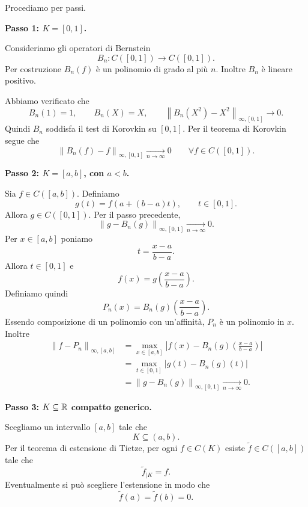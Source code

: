 \documentclass[a4paper]{article}
\begin{document}
\begin{snippetproof}{}
    Procediamo per passi.

    \medskip

    \noindent
    \textbf{Passo 1: \(K=[0,1]\).}

    Consideriamo gli operatori di Bernstein
    \[
        B_n : C([0,1])\longrightarrow C([0,1]).
    \]
    Per costruzione \(B_n(f)\) è un polinomio di grado al più \(n\). Inoltre \(B_n\) è lineare positivo.

    Abbiamo verificato che
    \[
        B_n(1)=1,
        \qquad
        B_n(X)=X,
        \qquad
        \left\|B_n(X^2)-X^2\right\|_{\infty,[0,1]}\to 0.
    \]
    Quindi \(B_n\) soddisfa il test di Korovkin su \([0,1]\). Per il teorema di Korovkin segue che
    \[
        \left\|B_n(f)-f\right\|_{\infty,[0,1]}
        \xrightarrow[n\to\infty]{}
        0
        \qquad
        \forall f\in C([0,1]).
    \]

    \medskip

    \noindent
    \textbf{Passo 2: \(K=[a,b]\), con \(a<b\).}

    Sia \(f\in C([a,b])\). Definiamo
    \[
        g(t)
        =
        f(a+(b-a)t),
        \qquad t\in[0,1].
    \]
    Allora \(g\in C([0,1])\). Per il passo precedente,
    \[
        \left\|g-B_n(g)\right\|_{\infty,[0,1]}
        \xrightarrow[n\to\infty]{}
        0.
    \]
    Per \(x\in[a,b]\) poniamo
    \[
        t=\frac{x-a}{b-a}.
    \]
    Allora \(t\in[0,1]\) e
    \[
        f(x)=g\left(\frac{x-a}{b-a}\right).
    \]
    Definiamo quindi
    \[
        P_n(x)
        =
        B_n(g)\left(\frac{x-a}{b-a}\right).
    \]
    Essendo composizione di un polinomio con un'affinità, \(P_n\) è un polinomio in \(x\). Inoltre
    \begin{align*}
        \left\|f-P_n\right\|_{\infty,[a,b]}
        &=
        \max_{x\in[a,b]}
        \left|
        f(x)
        -
        B_n(g)\left(\frac{x-a}{b-a}\right)
        \right| \\
        &=
        \max_{t\in[0,1]}
        \left|
        g(t)-B_n(g)(t)
        \right| \\
        &=
        \left\|g-B_n(g)\right\|_{\infty,[0,1]}
        \xrightarrow[n\to\infty]{}
        0.
    \end{align*}

    \medskip

    \noindent
    \textbf{Passo 3: \(K\subseteq\mathbb{R}\) compatto generico.}

    Scegliamo un intervallo \([a,b]\) tale che
    \[
        K\subseteq(a,b).
    \]
    Per il teorema di estensione di Tietze, per ogni \(f\in C(K)\) esiste \(\widetilde f\in C([a,b])\) tale che
    \[
        \widetilde f_{\mid K}=f.
    \]
    Eventualmente si può scegliere l'estensione in modo che
    \[
        \widetilde f(a)=\widetilde f(b)=0.
    \]


\end{snippetproof}
\end{document}

